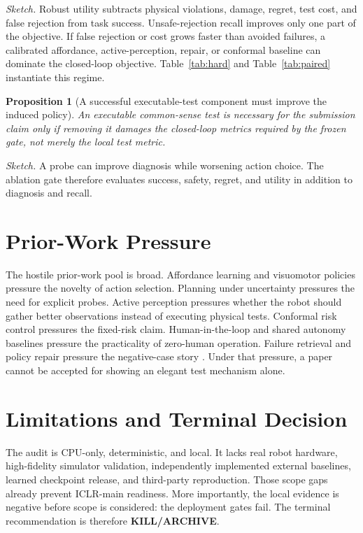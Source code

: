 \documentclass{article}
\newtheorem{proposition}{Proposition}
\newcommand{\terminalname}{KILL/ARCHIVE}
\begin{document}
\noindent\textit{Sketch.} Robust utility subtracts physical violations, damage, regret, test cost, and false rejection from task success. Unsafe-rejection recall improves only one part of the objective. If false rejection or cost grows faster than avoided failures, a calibrated affordance, active-perception, repair, or conformal baseline can dominate the closed-loop objective. Table~\ref{tab:hard} and Table~\ref{tab:paired} instantiate this regime.

\begin{proposition}[A successful executable-test component must improve the induced policy]
An executable common-sense test is necessary for the submission claim only if removing it damages the closed-loop metrics required by the frozen gate, not merely the local test metric.
\end{proposition}

\noindent\textit{Sketch.} A probe can improve diagnosis while worsening action choice. The ablation gate therefore evaluates success, safety, regret, and utility in addition to diagnosis and recall.

\section{Prior-Work Pressure}
The hostile prior-work pool is broad. Affordance learning and visuomotor policies pressure the novelty of action selection. Planning under uncertainty pressures the need for explicit probes. Active perception pressures whether the robot should gather better observations instead of executing physical tests. Conformal risk control pressures the fixed-risk claim. Human-in-the-loop and shared autonomy baselines pressure the practicality of zero-human operation. Failure retrieval and policy repair pressure the negative-case story \citep{commonsensedataacquisitionforindoormobiler,r103986pknv47i304,r101109tnnls20233252578,r101097jte0000000000000411,r101109biorob20105626917,r101093ptjpzx028,r101093ptjpzz044,r101093ptjpzac061,r101109icra20198794070,r260425788v2,r251022631v1,r102522ptj20150482,r101016jjcde201904002,r101097jte0000000000000103}. Under that pressure, a paper cannot be accepted for showing an elegant test mechanism alone.

\section{Limitations and Terminal Decision}
The audit is CPU-only, deterministic, and local. It lacks real robot hardware, high-fidelity simulator validation, independently implemented external baselines, learned checkpoint release, and third-party reproduction. Those scope gaps already prevent ICLR-main readiness. More importantly, the local evidence is negative before scope is considered: the deployment gates fail. The terminal recommendation is therefore \textbf{\terminalname}.
\end{document}
